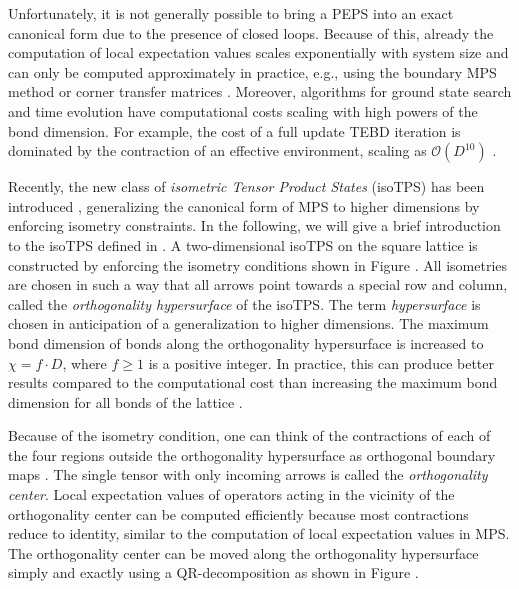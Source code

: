 Unfortunately, it is not generally possible to bring a PEPS into an exact canonical form due to the presence of closed loops. Because of this, already the computation of local expectation values scales exponentially with system size and can only be computed approximately in practice, e.g., using the boundary MPS method \cite{cite:practical_introduction_MPS_and_PEPS} or corner transfer matrices \cite{cite:CTMRG}. Moreover, algorithms for ground state search and time evolution have computational costs scaling with high powers of the bond dimension. For example, the cost of a full update TEBD iteration is dominated by the contraction of an effective environment, scaling as $\mathcal{O}\left(D^{10}\right)$ \cite{cite:unifying_PEPS_contractions}. \par
Recently, the new class of \textit{isometric Tensor Product States} (isoTPS) has been introduced \cite{cite:isometric_tensor_network_states_in_two_dimensions, cite:conversion_of_PEPS_into_a_canonical_form, cite:DMRG_approach_to_optimizing_2D_tensor_networks}, generalizing the canonical form of MPS to higher dimensions by enforcing isometry constraints. In the following, we will give a brief introduction to the isoTPS defined in \cite{cite:isometric_tensor_network_states_in_two_dimensions}. A two-dimensional isoTPS on the square lattice is constructed by enforcing the isometry conditions shown in Figure . All isometries are chosen in such a way that all arrows point towards a special row and column, called the \textit{orthogonality hypersurface} of the isoTPS. The term \textit{hypersurface} is chosen in anticipation of a generalization to higher dimensions. The maximum bond dimension of bonds along the orthogonality hypersurface is increased to $\chi = f\cdot D$, where $f \ge 1$ is a positive integer. In practice, this can produce better results compared to the computational cost than increasing the maximum bond dimension for all bonds of the lattice \cite{cite:efficient_simulation_of_dynamics_in_two_dimensional_quantum_spin_systems}. \par
Because of the isometry condition, one can think of the contractions of each of the four regions outside the orthogonality hypersurface as orthogonal boundary maps \cite{cite:efficient_simulation_of_dynamics_in_two_dimensional_quantum_spin_systems}. The single tensor with only incoming arrows is called the \textit{orthogonality center}. Local expectation values of operators acting in the vicinity of the orthogonality center can be computed efficiently because most contractions reduce to identity, similar to the computation of local expectation values in MPS. The orthogonality center can be moved along the orthogonality hypersurface simply and exactly using a QR-decomposition as shown in Figure .\par
